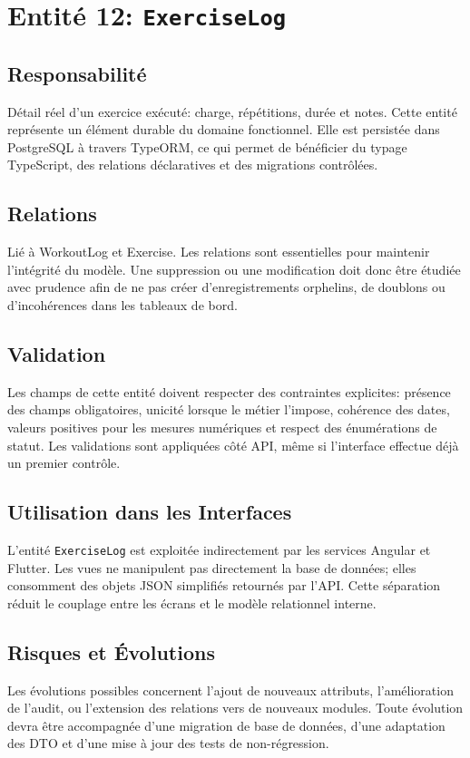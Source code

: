 \section{Entité 12: \texttt{ExerciseLog}}
\subsection{Responsabilité}
Détail réel d’un exercice exécuté: charge, répétitions, durée et notes. Cette entité représente un élément durable du domaine fonctionnel. Elle est persistée dans PostgreSQL à travers TypeORM, ce qui permet de bénéficier du typage TypeScript, des relations déclaratives et des migrations contrôlées.

\subsection{Relations}
Lié à WorkoutLog et Exercise. Les relations sont essentielles pour maintenir l'intégrité du modèle. Une suppression ou une modification doit donc être étudiée avec prudence afin de ne pas créer d'enregistrements orphelins, de doublons ou d'incohérences dans les tableaux de bord.

\subsection{Validation}
Les champs de cette entité doivent respecter des contraintes explicites: présence des champs obligatoires, unicité lorsque le métier l'impose, cohérence des dates, valeurs positives pour les mesures numériques et respect des énumérations de statut. Les validations sont appliquées côté API, même si l'interface effectue déjà un premier contrôle.

\subsection{Utilisation dans les Interfaces}
L'entité \texttt{ExerciseLog} est exploitée indirectement par les services Angular et Flutter. Les vues ne manipulent pas directement la base de données; elles consomment des objets JSON simplifiés retournés par l'API. Cette séparation réduit le couplage entre les écrans et le modèle relationnel interne.

\subsection{Risques et Évolutions}
Les évolutions possibles concernent l'ajout de nouveaux attributs, l'amélioration de l'audit, ou l'extension des relations vers de nouveaux modules. Toute évolution devra être accompagnée d'une migration de base de données, d'une adaptation des DTO et d'une mise à jour des tests de non-régression.

